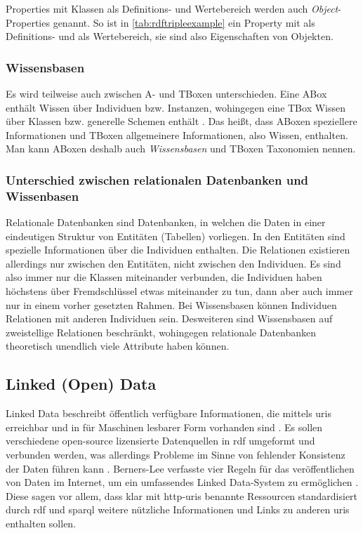 Properties mit Klassen als Definitions- und Wertebereich werden auch \emph{Object}-Properties genannt.
So ist in \cref{tab:rdftripleexample}  ein Property mit  als Definitions- und  als Wertebereich,
sie sind also Eigenschaften von Objekten.

\subsubsection{Wissensbasen}
Es wird teilweise auch zwischen A- und TBoxen unterschieden.
Eine ABox enthält Wissen über Individuen bzw. Instanzen, wohingegen eine TBox Wissen über Klassen bzw. generelle Schemen enthält \citep[S.~167]{semanticwebgrundlagen}.
Das heißt, dass ABoxen speziellere Informationen und TBoxen allgemeinere Informationen, also Wissen, enthalten.
Man kann ABoxen deshalb auch \emph{Wissensbasen} und TBoxen Taxonomien nennen.

\subsubsection{Unterschied zwischen relationalen Datenbanken und Wissenbasen}
Relationale Datenbanken sind Datenbanken, in welchen die Daten in einer eindeutigen Struktur von Entitäten (Tabellen) vorliegen.
In den Entitäten sind spezielle Informationen über die Individuen enthalten.
Die Relationen existieren allerdings nur zwischen den Entitäten, nicht zwischen den Individuen.
Es sind also immer nur die Klassen miteinander verbunden, die Individuen haben höchstens über Fremdschlüssel etwas miteinander zu tun, dann aber auch immer nur in einem vorher gesetzten Rahmen.
Bei Wissensbasen können Individuen Relationen mit anderen Individuen sein.
Desweiteren sind Wissensbasen auf zweistellige Relationen beschränkt, wohingegen relationale Datenbanken theoretisch unendlich viele Attribute haben können.

\subsection{Linked (Open) Data}

Linked Data beschreibt öffentlich verfügbare Informationen, die mittels \acp{uri} erreichbar und in für Maschinen lesbarer Form vorhanden sind \citep{linkeddata}.
Es sollen verschiedene open-source lizensierte Datenquellen in \ac{rdf} umgeformt und verbunden werden, was allerdings Probleme im Sinne von fehlender Konsistenz der Daten führen kann \citep{semanticwebreview}.
Berners-Lee verfasste vier Regeln für das veröffentlichen von Daten im Internet, um ein umfassendes Linked Data-System zu ermöglichen \citep{linkeddatadesignissues}.
Diese sagen vor allem, dass klar mit \ac{http}-\acp{uri} benannte Ressourcen standardisiert durch \ac{rdf} und \ac{sparql} weitere nützliche Informationen und Links zu anderen \acp{uri} enthalten sollen.

